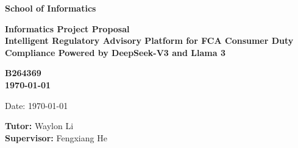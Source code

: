 \documentclass[a4paper,11pt]{article}
\newcommand{\examnumber}{B264369}
\newcommand{\field}{Intelligent Regulatory Advisory Platform for FCA Consumer Duty Compliance Powered by DeepSeek-V3 and Llama 3}
\newcommand{\tutor}{Waylon Li}
\newcommand{\supervisor}{Fengxiang He}
\begin{document}
\begin{minipage}[b]{110mm}
        {\Huge\bf School of Informatics
        \vspace*{17mm}}
\end{minipage}
\hfill
\begin{minipage}[t]{40mm}               
\end{minipage}
\par\noindent
\vspace*{2cm}
\begin{center}
        \Large\bf Informatics Project Proposal \\
        \Large\bf \field
\end{center}
\vspace*{1.5cm}
\begin{center}
        \bf \examnumber\\
        \monthyeardate\today
\end{center}
\vspace*{5mm}

%
%                       
\begin{abstract}
        This research proposes an intelligent compliance consulting platform leveraging DeepSeek-V3 and Llama 3 to enhance regulatory understanding and implementation of the FCA’s Consumer Duty provisions. By integrating semantic retrieval and generative question-answering in a Retrieval-Augmented Generation (RAG) architecture, the platform aims to address the inefficiency and inconsistency of traditional compliance methods. The research demonstrates the feasibility and value of applying large language models to financial regulation, filling a significant research gap in RegTech and contributing to the digital transformation of consumer protection in UK financial services.
\end{abstract}

\vspace*{1cm}

\vspace*{3cm}
Date: \today

\vfill
{\bf Tutor:} \tutor\\
{\bf Supervisor:} \supervisor
\newpage

%
\end{document}
